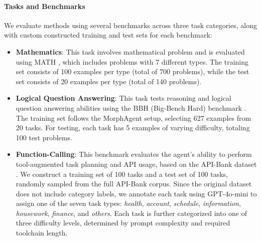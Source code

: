 \documentclass{article}
\begin{document}
\paragraph{Tasks and Benchmarks}
We evaluate methods using several benchmarks across three task categories, along with custom constructed training and test sets for each benchmark:\vspace{-0.2cm}
\begin{itemize}
\item \textbf{Mathematics}: This task involves mathematical problem and is evaluated using MATH \cite{hendrycksmath2021}, which includes problems with 7 different types. The training set consists of 100 examples per type (total of 700 problems), while the test set consists of 20 examples per type (total of 140 problems). 

\item \textbf{Logical Question Answering}: This task tests reasoning and logical question answering abilities using the BBH (Big-Bench Hard) benchmark \cite{suzgun2022challengingbigbenchtaskschainofthought}. The training set follows the MorphAgent setup, selecting 627 examples from 20 tasks. For testing, each task has 5 examples of varying difficulty, totaling 100 test problems.

\item \textbf{Function-Calling}: This benchmark evaluates the agent's ability to perform tool-augmented task planning and API usage, based on the API-Bank dataset \cite{li2023apibankcomprehensivebenchmarktoolaugmented}. We construct a training set of 100 tasks and a test set of 100 tasks, randomly sampled from the full API-Bank corpus. Since the original dataset does not include category labels, we annotate each task using GPT-4o-mini to assign one of the seven task types: \textit{health}, \textit{account}, \textit{schedule}, \textit{information}, \textit{housework}, \textit{finance}, and \textit{others}. Each task is further categorized into one of three difficulty levels, determined by prompt complexity and required toolchain length.

\end{itemize}


\end{document}
